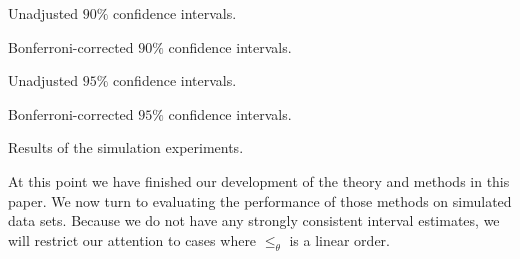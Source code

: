 \documentclass[12pt]{article}
\newcommand{\pord}{{\leqslant_{\theta}}}
\numberwithin{theorem}{section}
\begin{document}
\begin{table}[p]

\begin{subtable}{\textwidth}
\centering

\caption{Unadjusted $90\%$ confidence intervals.}
\end{subtable}
\par\bigskip

\begin{subtable}{\textwidth}
\centering

\caption{Bonferroni-corrected $90\%$ confidence intervals.}
\end{subtable}
\par\bigskip

\begin{subtable}{\textwidth}
\centering

\caption{Unadjusted $95\%$ confidence intervals.}
\end{subtable}
\par\bigskip

\begin{subtable}{\textwidth}
\centering

\caption{Bonferroni-corrected $95\%$ confidence intervals.}
\end{subtable}

\caption{Results of the simulation experiments.}
\label{tab_results}
\end{table}

At this point we have finished our development of the theory and methods in this paper.  We now turn to evaluating the performance of those methods on simulated data sets.  Because we do not have any strongly consistent interval estimates, we will restrict our attention to cases where $\pord$ is a linear order.
\end{document}

